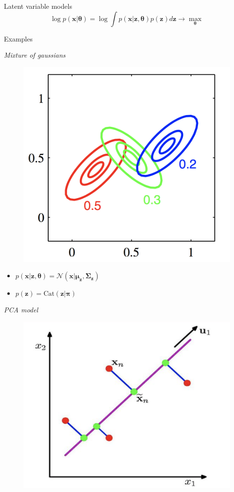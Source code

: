 \documentclass{beamer}
\newcommand{\bx}{\mathbf{x}}
\newcommand{\bz}{\mathbf{z}}
\newcommand{\btheta}{\boldsymbol{\theta}}
\begin{document}
\begin{frame}{Latent variable models}
    \[
    \log p(\bx | \btheta) = \log \int p(\bx | \bz, \btheta) p(\bz) d\bz \rightarrow \max_{\btheta}
    \]
    \vspace{-0.6cm}
    \begin{block}{Examples}
    \begin{minipage}[t]{0.45\columnwidth}
		\textit{Mixture of gaussians} \\
		\vspace{-0.5cm}
		\begin{figure}
			\centering
			\includegraphics[width=0.75\linewidth]{figs/mixture_of_gaussians.png}
		\end{figure}
		\vspace{-0.5cm}
	    \begin{itemize}
	        \item $p(\bx | \bz, \btheta) = \mathcal{N}(\bx | \boldsymbol{\mu}_\bz, \boldsymbol{\Sigma}_\bz)$
	        \item $p(\bz) = \text{Cat}(\bz | \boldsymbol{\pi})$
	    \end{itemize}
	\end{minipage}%
	\begin{minipage}[t]{0.53\columnwidth}
		\textit{PCA model} \\
		\vspace{-0.5cm}
		\begin{figure}
			\centering
			\includegraphics[width=.7\linewidth]{figs/pca.png}

\end{figure}
\end{minipage}
\end{block}
\end{frame}
\end{document}
